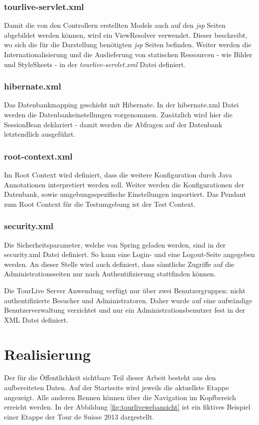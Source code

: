 \subsubsection{tourlive-servlet.xml}
Damit die von den Controllern erstellten Models auch auf den \textit{\gls{jsp}} Seiten abgebildet werden können, wird ein ViewResolver verwendet. Dieser beschreibt, wo sich die für die Darstellung benötigten \textit{\gls{jsp}} Seiten befinden. Weiter werden die Internationalisierung und die Auslieferung von statischen Ressourcen - wie Bilder und StyleSheets - in der \textit{tourlive-servlet.xml} Datei definiert.

\subsubsection{hibernate.xml}
Das Datenbankmapping geschieht mit Hibernate. In der hibernate.xml Datei werden die Datenbankeinstellungen vorgenommen. Zusätzlich wird hier die SessionBean deklariert - damit werden die Abfragen auf der Datenbank letztendlich ausgeführt.

\subsubsection{root-context.xml}
Im Root Context wird definiert, dass die weitere Konfiguration durch Java Annotationen interpretiert werden soll. Weiter werden die Konfigurationen der Datenbank, sowie umgebungsspezifische Einstellungen importiert. Das Pendant zum Root Context für die Testumgebung ist der Test Context.

\subsubsection{security.xml}
Die Sicherheitsparameter, welche von Spring geladen werden, sind in der security.xml Datei definiert. So kann eine Login- und eine Logout-Seite angegeben werden. An dieser Stelle wird auch definiert, dass sämtliche Zugriffe auf die Administrationsseiten nur nach Authentifizierung stattfinden können.

Die TourLive Server Anwendung verfügt nur über zwei Benutzergruppen: nicht authentifizierte Besucher und Administratoren. Daher wurde auf eine aufwändige Benutzerverwaltung verzichtet und nur ein Administrationsbenutzer fest in der XML Datei definiert.

\section{Realisierung}
Der für die Öffentlichkeit sichtbare Teil dieser Arbeit besteht aus den aufbereiteten Daten. Auf der Startseite wird jeweils die aktuellste Etappe angezeigt. Alle anderen Rennen können über die Navigation im Kopfbereich erreicht werden. In der Abbildung \ref{fig:tourlivewebansicht} ist ein fiktives Beispiel einer Etappe der Tour de Suisse 2013 dargestellt.

